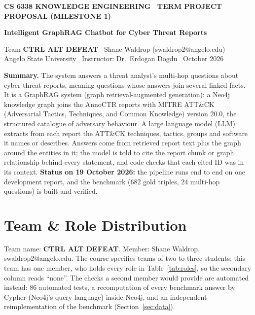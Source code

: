 \documentclass[10pt]{article}
\begin{document}
\thispagestyle{first}

{\sffamily
{\color{accent}\footnotesize\bfseries CS 6338 KNOWLEDGE ENGINEERING \textbullet\ TERM PROJECT PROPOSAL (MILESTONE 1)}\par\vspace{2pt}
{\color{ink}\LARGE\bfseries Intelligent GraphRAG Chatbot for Cyber Threat Reports}\par\vspace{3pt}
{\small Team \textbf{CTRL ALT DEFEAT} \textbullet\ Shane Waldrop (swaldrop2@angelo.edu)\\ Angelo State University \textbullet\ Instructor: Dr.\ Erdogan Dogdu \textbullet\ October 2026}\par}
\vspace{4pt}
\noindent\colorbox{shade}{\parbox{\dimexpr\textwidth-2\fboxsep}{\small
\textbf{Summary.} The system answers a threat analyst's multi-hop questions about cyber threat reports, meaning questions whose answers join several linked facts. It is a GraphRAG system (graph retrieval-augmented generation): a Neo4j knowledge graph joins the AnnoCTR reports with MITRE ATT\&CK (Adversarial Tactics, Techniques, and Common Knowledge) version 20.0, the structured catalogue of adversary behaviour. A large language model (LLM) extracts from each report the ATT\&CK techniques, tactics, groups and software it names or describes. Answers come from retrieved report text plus the graph around the entities in it; the model is told to cite the report chunk or graph relationship behind every statement, and code checks that each cited ID was in its context. \textbf{Status on 19 October 2026:} the pipeline runs end to end on one development report, and the benchmark (682 gold triples, 24 multi-hop questions) is built and verified.}}

\section{Team \& Role Distribution}
Team name: \textbf{CTRL ALT DEFEAT}. Member: Shane Waldrop, swaldrop2@angelo.edu. The course specifies teams of two to three students; this team has one member, who holds every role in Table~\ref{tab:roles}, so the secondary column reads ``none''. The checks a second member would provide are automated instead: 86 automated tests, a recomputation of every benchmark answer by Cypher (Neo4j's query language) inside Neo4j, and an independent reimplementation of the benchmark (Section~\ref{sec:data}).
\end{document}
